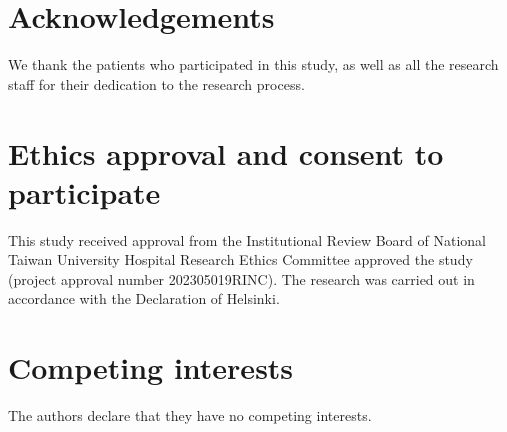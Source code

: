 \documentclass{bmcart}
\begin{document}
\begin{backmatter}


\section*{Acknowledgements}%
We thank the patients who participated in this study, as well as all the research staff for their dedication to the research process.



\section*{Ethics approval and consent to participate}%
This study received approval from the Institutional Review Board of National Taiwan University Hospital Research Ethics Committee approved the study (project approval number 202305019RINC). The research was carried out in accordance with the Declaration 
of Helsinki.

\section*{Competing interests}
The authors declare that they have no competing interests.





\end{backmatter}
\end{document}
